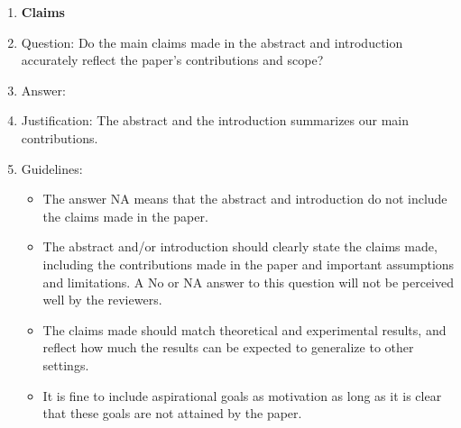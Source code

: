 \documentclass{article}
\begin{document}
\begin{enumerate}

\item {\bf Claims}
    \item[] Question: Do the main claims made in the abstract and introduction accurately reflect the paper's contributions and scope?
    \item[] Answer: \answerYes{} %
    \item[] Justification: The abstract and the introduction summarizes our main contributions.
    \item[] Guidelines:
    \begin{itemize}
        \item The answer NA means that the abstract and introduction do not include the claims made in the paper.
        \item The abstract and/or introduction should clearly state the claims made, including the contributions made in the paper and important assumptions and limitations. A No or NA answer to this question will not be perceived well by the reviewers. 
        \item The claims made should match theoretical and experimental results, and reflect how much the results can be expected to generalize to other settings. 
        \item It is fine to include aspirational goals as motivation as long as it is clear that these goals are not attained by the paper. 
    \end{itemize}


\end{enumerate}
\end{document}
